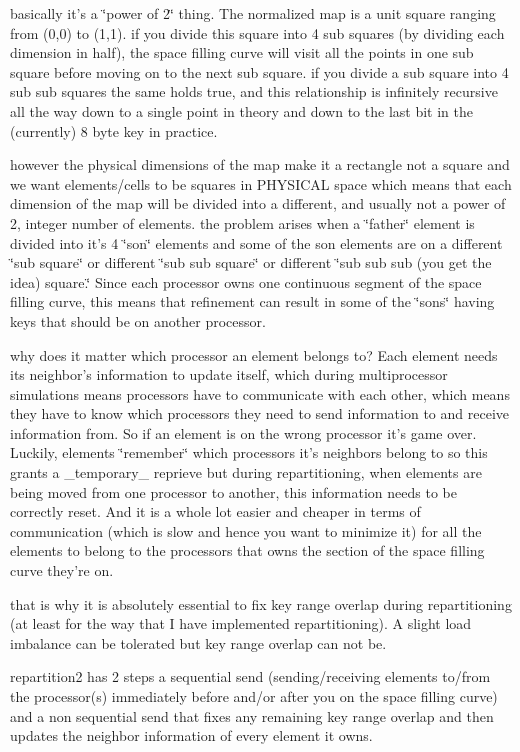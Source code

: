 basically it's a \char`\"{}power of 2\char`\"{} thing. The normalized map is a unit square ranging from (0,0) to (1,1). if you divide this square into 4 sub squares (by dividing each dimension in half), the space filling curve will visit all the points in one sub square before moving on to the next sub square. if you divide a sub square into 4 sub sub squares the same holds true, and this relationship is infinitely recursive all the way down to a single point in theory and down to the last bit in the (currently) 8 byte key in practice.

however the physical dimensions of the map make it a rectangle not a square and we want elements/cells to be squares in PHYSICAL space which means that each dimension of the map will be divided into a different, and usually not a power of 2, integer number of elements. the problem arises when a \char`\"{}father\char`\"{} element is divided into it's 4 \char`\"{}son\char`\"{} elements and some of the son elements are on a different \char`\"{}sub square\char`\"{} or different \char`\"{}sub sub square\char`\"{} or different \char`\"{}sub sub sub (you get the idea) square.\char`\"{} Since each processor owns one continuous segment of the space filling curve, this means that refinement can result in some of the \char`\"{}sons\char`\"{} having keys that should be on another processor.

why does it matter which processor an element belongs to? Each element needs its neighbor's information to update itself, which during multiprocessor simulations means processors have to communicate with each other, which means they have to know which processors they need to send information to and receive information from. So if an element is on the wrong processor it's game over. Luckily, elements \char`\"{}remember\char`\"{} which processors it's neighbors belong to so this grants a \_\-temporary\_\- reprieve but during repartitioning, when elements are being moved from one processor to another, this information needs to be correctly reset. And it is a whole lot easier and cheaper in terms of communication (which is slow and hence you want to minimize it) for all the elements to belong to the processors that owns the section of the space filling curve they're on.

that is why it is absolutely essential to fix key range overlap during repartitioning (at least for the way that I have implemented repartitioning). A slight load imbalance can be tolerated but key range overlap can not be.

repartition2 has 2 steps a sequential send (sending/receiving elements to/from the processor(s) immediately before and/or after you on the space filling curve) and a non sequential send that fixes any remaining key range overlap and then updates the neighbor information of every element it owns.

